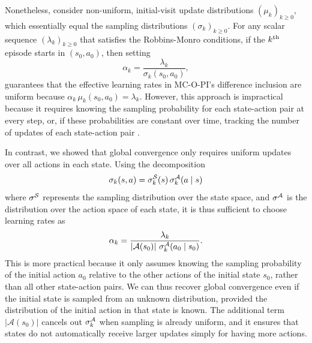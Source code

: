 Nonetheless, consider non-uniform, initial-visit update distributions $(\mu_k)_{k \ge 0}$, which essentially equal the sampling distributions $(\sigma_k)_{k \ge 0}$.
For any scalar sequence $(\lambda_k)_{k \ge 0}$ that satisfies the Robbins-Monro conditions,
if the $k^{\textup{th}}$ episode starts in $(s_0, a_0)$, then setting
\[
    \alpha_k = \frac{\lambda_k}{\sigma_k(s_0, a_0)} , 
\]
guarantees that the effective learning rates in MC-O-PI's difference inclusion are uniform because $\alpha_k \, \mu_k(s_0, a_0) = \lambda_k$.
However, this approach is impractical because it requires knowing the sampling probability for each state-action pair at every step,
or, if these probabilities are constant over time, tracking the number of updates of each state-action pair \citep[p.~66]{Tsitsiklis2002OnIteration}.




In contrast, we showed that global convergence only requires uniform updates over all actions in each state.
Using the decomposition
\[
\sigma_k(s,a) = \sigma^{\mathcal{S}}_k(s) \, \sigma^{\mathcal{A}}_k(a \mid s)
\]
where $\sigma^{\mathcal{S}}$ represents the sampling distribution over the state space,
and $\sigma^{\mathcal{A}}$ is the distribution over the action space of each state,
it is thus sufficient to choose learning rates as
\[
    \alpha_k = \frac{\lambda_k}{|\mathcal A(s_0)| \ \sigma^{\mathcal{A}}_k(a_0 \mid s_0)}.
\]
This is more practical because it only assumes knowing the sampling probability of the initial action $a_0$ relative to the other actions of the initial state $s_0$, rather than all other state-action pairs.
We can thus recover global convergence 
even if the initial state is sampled from an unknown distribution, provided the distribution of the initial action in that state is known.
The additional term $|\mathcal A(s_0)|$ cancels out $\sigma_k^{\mathcal{A}}$ when sampling is already uniform, and it ensures that states do not automatically receive larger updates simply for having more actions.

